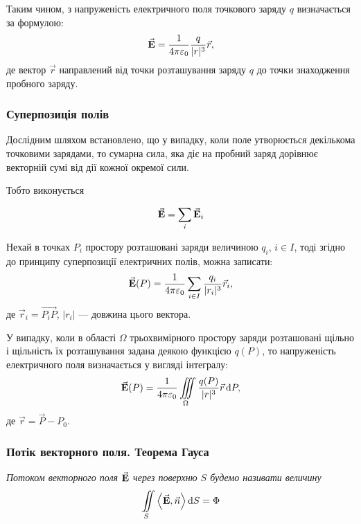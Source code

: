 Таким чином, з напруженість електричного поля точкового заряду $q$ визначається за формулою:
\begin{equation}
	{\vec{\mathbf{E}}} = \frac{1}{4 \pi \varepsilon_0} \frac{q}{|r|^3} \vec r,
\end{equation}
де вектор $\vec r$ направлений від точки розташування заряду $q$ до точки знаходження пробного заряду. 

\subsubsection{Суперпозиція полів}

Дослідним шляхом встановлено, що у випадку, коли поле утворюється декількома точковими зарядами, то сумарна сила, яка діє на пробний заряд дорівнює векторній сумі від дії кожної окремої сили. \medskip

Тобто виконується
\begin{th_principle}
	\begin{equation}
		{\vec{\mathbf{E}}} = \displaystyle\sum\limits_i {\vec{\mathbf{E}}}_i	
	\end{equation}
\end{th_principle}

Нехай в точках $P_i$ простору розташовані заряди величиною $q_i$, $i \in I$, тоді згідно до принципу суперпозиції електричних полів, можна записати:
\begin{equation}
	{\vec{\mathbf{E}}}(P) = \frac{1}{4 \pi \varepsilon_0} \displaystyle\sum\limits_{i \in I} \frac{q_i}{|r_i|^3} \vec r_i,
\end{equation}
де $\vec r_i = \overrightarrow{P_iP}$, $|r_i|$ --- довжина цього вектора. \medskip

У випадку, коли в області $\Omega$ трьохвимірного простору заряди розташовані щільно і щільність їх розташування задана деякою функцією $q(P)$, то напруженість електричного поля визначається у вигляді інтегралу:
\begin{equation}
	{\vec{\mathbf{E}}}(P) = \frac{1}{4 \pi \varepsilon_0} \displaystyle\iiint\limits_\Omega \frac{q(P)}{|r|^3} \vec r \mathop{}\!\mathrm{d} P,
\end{equation}
де $\vec r = \vec P - P_0$.

\subsubsection{Потік векторного поля. Теорема Гауса}

\begin{definition}
	\it{Потоком векторного поля} ${\vec{\mathbf{E}}}$ через поверхню $S$ будемо називати величину
	\begin{equation}
		\Iint_S \langle \vecf E, \vec n \rangle \diff S = \Phi
	\end{equation}
\end{definition}

